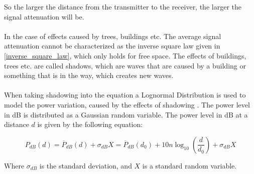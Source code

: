 So the larger the distance from the transmitter to the receiver, the larger the signal attenuation will be. 
\\
\\
In the case of effects caused by trees, buildings etc. The average signal attenuation cannot be characterized as the inverse square law given in \ref{inverse_square_law}, which only holds for free space. The effects of buildings, trees etc. are called shadows, which are waves that are caused by a building or something that is in the way, which creates new waves.
\\
\\
When taking shadowing into the equation a Lognormal Distribution is used to model the power variation, caused by the effects of shadowing \citep{large_scale_fade3}. The power level in dB is distributed as a Gaussian random variable. The power level in dB at a distance $d$ is given by the following equation:

\begin{equation}
P_{dB}(d) = \overline{P}_{dB}(d)+ \sigma_{dB}X = \overline{P}_{dB}(d_{0}) + 10n\log_{10}(\frac{d}{d_{0}})+ \sigma_{dB}X
\label{power_level}
\end{equation}     

Where $\sigma_{dB}$ is the standard deviation, and $X$ is a standard random variable. 


